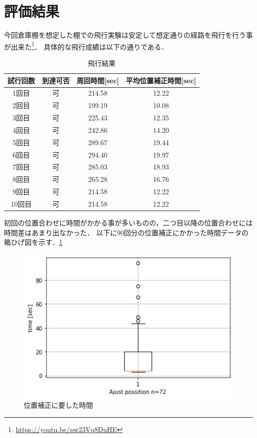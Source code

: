 \section{評価結果}
今回倉庫棚を想定した棚での飛行実験は安定して想定通りの経路を飛行を行う事が出来た\footnote{\url{https://youtu.be/pw23Vq8DuHE}}．
具体的な飛行成績は以下の通りである．

\begin{table}[h]
    \caption{飛行結果}
    \label{table:fly_result}
    \centering
    \begin{tabular}{cccc}
        \hline
        試行回数 & 到達可否 & 周回時間[sec] & 平均位置補正時間[sec] \\
        \hline \hline
        1回目 & 可 & 214.58 & 12.22 \\
        2回目 & 可 & 199.19 & 10.08 \\
        3回目 & 可 & 225.43 & 12.35 \\
        4回目 & 可 & 242.86 & 14.20 \\
        5回目 & 可 & 289.67 & 19.44 \\
        6回目 & 可 & 294.40 & 19.97 \\
        7回目 & 可 & 285.03 & 18.93 \\
        8回目 & 可 & 265.28 & 16.76 \\

        9回目 & 可 & 214.58 & 12.22 \\
        10回目 & 可 & 214.58 & 12.22 \\
        \hline
    \end{tabular}
\end{table}

初回の位置合わせに時間がかかる事が多いものの，二つ目以降の位置合わせには時間差はあまり出なかった．
以下に90回分の位置補正にかかった時間データの箱ひげ図を示す．\ref{box_plot}

\begin{figure}[htbp]
    \begin{center}
      \includegraphics[clip,width=15.0cm]{img/timedata.png}
      \caption{位置補正に要した時間}
      \label{box_plot}
    \end{center}
  \end{figure}